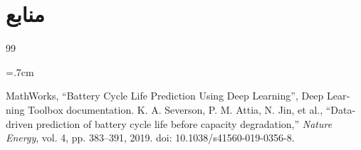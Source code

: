 \section{منابع}

\begingroup
\renewcommand\section[2]{}
\begin{thebibliography}{99}

\begin{latin}
\baselineskip=.7cm


\noindent MathWorks, ``Battery Cycle Life Prediction Using Deep Learning'', Deep Learning Toolbox documentation.
\noindent K. A. Severson, P. M. Attia, N. Jin, et al.,
``Data-driven prediction of battery cycle life before capacity degradation,''
\textit{Nature Energy}, vol. 4, pp. 383--391, 2019.
doi: 10.1038/s41560-019-0356-8.



\end{latin}

\end{thebibliography}
\endgroup
